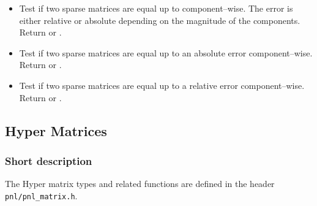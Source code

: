 \begin{itemize}
  \item {}
    \sshortdescribe Test if two sparse matrices are equal up to  component--wise. The error  is either relative or absolute depending on the magnitude of the components. Return  or .
  \item {}
    \sshortdescribe Test if two sparse matrices are equal up to an absolute error  component--wise. Return  or .
  \item {}
    \sshortdescribe Test if two sparse matrices are equal up to a relative error  component--wise. Return  or .
\end{itemize}


\subsection{Hyper Matrices}
\subsubsection{Short description}

The Hyper matrix types and related functions are defined in the header \verb!pnl/pnl_matrix.h!.

